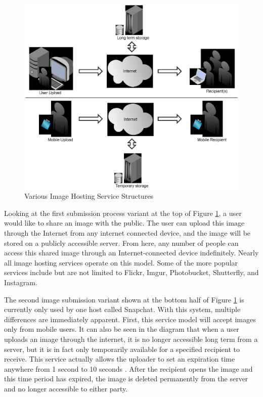 \begin{figure}[htbp]
\centering
\includegraphics[width=4.5in]{imageshareprocess}
\caption{Various Image Hosting Service Structures}
\label{imageshareprocess}
\end{figure}

Looking at the first submission process variant at the top of Figure \ref{imageshareprocess}, a user would like to share an image with the public. The user can upload this image through the Internet from any internet connected device, and the image will be stored on a publicly accessible server. From here, any number of people can access this shared image through an Internet-connected device indefinitely. Nearly all image hosting services operate on this model. Some of the more popular services include but are not limited to Flickr, Imgur, Photobucket, Shutterfly, and Instagram.

The second image submission variant shown at the bottom half of Figure \ref{imageshareprocess} is currently only used by one host called Snapchat. With this system, multiple differences are immediately apparent. First, this service model will accept images only from mobile users. It can also be seen in the diagram that when a user uploads an image through the internet, it is no longer accessible long term from a server, but it is in fact only temporarily available for a specified recipient to receive. This service actually allows the uploader to set an expiration time anywhere from 1 second to 10 seconds \cite{snap:support}. After the recipient opens the image and this time period has expired, the image is deleted permanently from the server and no longer accessible to either party.

